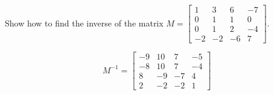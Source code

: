 
\begin{exerciseStatement}


Show how to find the inverse of the matrix \(M= \left[\begin{array}{cccc}
1 & 3 & 6 & -7 \\
0 & 1 & 1 & 0 \\
0 & 1 & 2 & -4 \\
-2 & -2 & -6 & 7
\end{array}\right] \).


\end{exerciseStatement}
    
\begin{exerciseAnswer} 
\[M^{-1}= \left[\begin{array}{cccc}
-9 & 10 & 7 & -5 \\
-8 & 10 & 7 & -4 \\
8 & -9 & -7 & 4 \\
2 & -2 & -2 & 1
\end{array}\right] \]
\end{exerciseAnswer}
    
